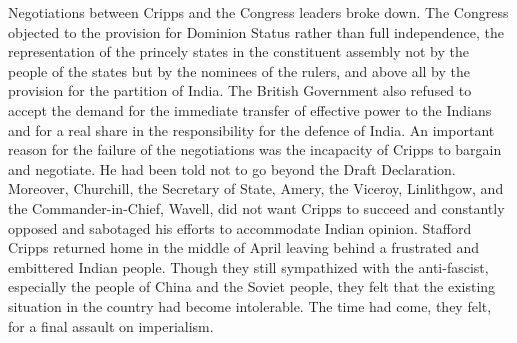 Negotiations between Cripps and the Congress leaders broke down. The Congress objected to the provision for Dominion Status rather than full independence, the representation of the princely states in the constituent assembly not by the people of the states but by the nominees of the rulers, and above all by the provision for the partition of India. The British Government also refused to accept the demand for the immediate transfer of effective power to the Indians and for a real share in the responsibility for the defence of India. An important reason for the failure of the negotiations was the incapacity of Cripps to bargain and negotiate. He had been told not to go beyond the Draft Declaration. Moreover, Churchill, the Secretary of State, Amery, the Viceroy, Linlithgow, and the Commander-in-Chief, Wavell, did not want Cripps to succeed and constantly opposed and sabotaged his efforts to accommodate Indian opinion. Stafford Cripps returned home in the middle of April leaving behind a frustrated and embittered Indian people. Though they still sympathized with the anti-fascist, especially the people of China and the Soviet people, they felt that the existing situation in the country had become intolerable. The time had come, they felt, for a final assault on imperialism.
